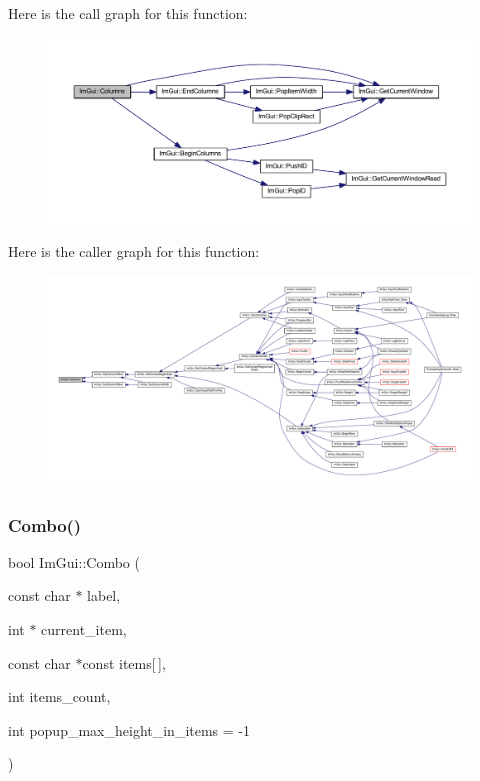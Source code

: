 Here is the call graph for this function\+:
\nopagebreak
\begin{figure}[H]
\begin{center}
\leavevmode
\includegraphics[width=350pt]{namespace_im_gui_a0e2889956542527c4039b6b8bf5c2a38_cgraph}
\end{center}
\end{figure}
Here is the caller graph for this function\+:
\nopagebreak
\begin{figure}[H]
\begin{center}
\leavevmode
\includegraphics[width=350pt]{namespace_im_gui_a0e2889956542527c4039b6b8bf5c2a38_icgraph}
\end{center}
\end{figure}
\mbox{\label{namespace_im_gui_aa2979368da5b9e98d368449b36d166b2}} 
\subsubsection{\texorpdfstring{Combo()}{Combo()}\hspace{0.1cm}{\footnotesize\ttfamily [1/3]}}
{\footnotesize\ttfamily bool Im\+Gui\+::\+Combo (\begin{DoxyParamCaption}\item[{const char $\ast$}]{label,  }\item[{int $\ast$}]{current\+\_\+item,  }\item[{const char $\ast$const}]{items\mbox{[}$\,$\mbox{]},  }\item[{int}]{items\+\_\+count,  }\item[{int}]{popup\+\_\+max\+\_\+height\+\_\+in\+\_\+items = {\ttfamily -\/1} }\end{DoxyParamCaption})}

